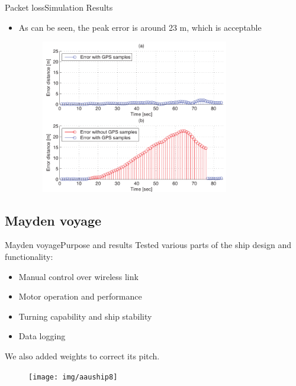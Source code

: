 \documentclass[10pt]{beamer}
\begin{document}

	\begin{frame}{Packet loss}{Simulation Results}
		\begin{itemize}
		  	\item As can be seen, the peak error is around 23 m, which is acceptable
			\begin{figure}
				\begin{center}
					\includegraphics[width=8.2cm]{img/error}
					\label{fig:error}
				\end{center}
			\end{figure}
		\end{itemize}
	\end{frame}


	\subsection{Mayden voyage}
	\begin{frame}{Mayden voyage}{Purpose and results}
	  Tested various parts of the ship design and functionality:
	  \begin{itemize}
	  	\item Manual control over wireless link
	  	\item Motor operation and performance
		\item Turning capability and ship stability
		\item Data logging
	  	\end{itemize}
	  	We also added weights to correct its pitch.
		\begin{figure}
			\begin{center}
				\texttt{[image: img/aauship8]}
				\label{fig:aauship}
			\end{center}
		\end{figure}
	\end{frame}
\end{document}
